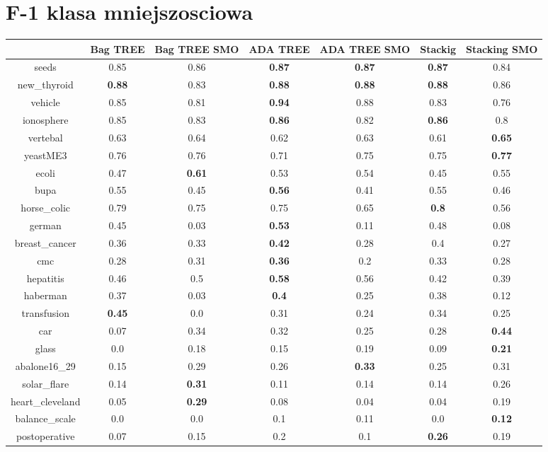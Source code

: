 \documentclass{article}%
\begin{document}
\section*{F{-}1 klasa mniejszosciowa}%
\begin{tabular}{c|cccccc}%
&Bag TREE&Bag TREE SMO&ADA TREE&ADA TREE SMO&Stackig&Stacking SMO\\%
\hline%
seeds&0.85&0.86&\textbf{0.87}&\textbf{0.87}&\textbf{0.87}&0.84\\%
new\_thyroid&\textbf{0.88}&0.83&\textbf{0.88}&\textbf{0.88}&\textbf{0.88}&0.86\\%
vehicle&0.85&0.81&\textbf{0.94}&0.88&0.83&0.76\\%
ionosphere&0.85&0.83&\textbf{0.86}&0.82&\textbf{0.86}&0.8\\%
vertebal&0.63&0.64&0.62&0.63&0.61&\textbf{0.65}\\%
yeastME3&0.76&0.76&0.71&0.75&0.75&\textbf{0.77}\\%
ecoli&0.47&\textbf{0.61}&0.53&0.54&0.45&0.55\\%
bupa&0.55&0.45&\textbf{0.56}&0.41&0.55&0.46\\%
horse\_colic&0.79&0.75&0.75&0.65&\textbf{0.8}&0.56\\%
german&0.45&0.03&\textbf{0.53}&0.11&0.48&0.08\\%
breast\_cancer&0.36&0.33&\textbf{0.42}&0.28&0.4&0.27\\%
cmc&0.28&0.31&\textbf{0.36}&0.2&0.33&0.28\\%
hepatitis&0.46&0.5&\textbf{0.58}&0.56&0.42&0.39\\%
haberman&0.37&0.03&\textbf{0.4}&0.25&0.38&0.12\\%
transfusion&\textbf{0.45}&0.0&0.31&0.24&0.34&0.25\\%
car&0.07&0.34&0.32&0.25&0.28&\textbf{0.44}\\%
glass&0.0&0.18&0.15&0.19&0.09&\textbf{0.21}\\%
abalone16\_29&0.15&0.29&0.26&\textbf{0.33}&0.25&0.31\\%
solar\_flare&0.14&\textbf{0.31}&0.11&0.14&0.14&0.26\\%
heart\_cleveland&0.05&\textbf{0.29}&0.08&0.04&0.04&0.19\\%
balance\_scale&0.0&0.0&0.1&0.11&0.0&\textbf{0.12}\\%
postoperative&0.07&0.15&0.2&0.1&\textbf{0.26}&0.19\\%
\end{tabular}

%
\end{document}
